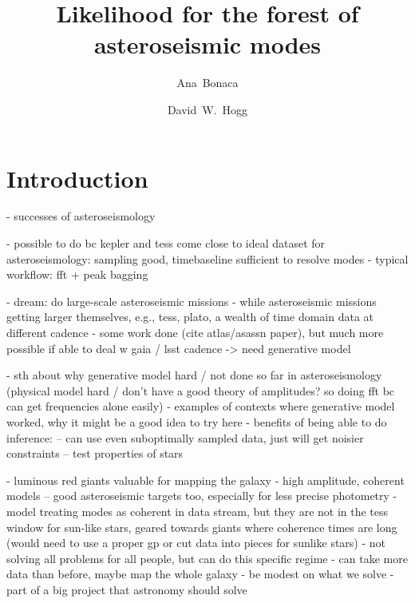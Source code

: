 \documentclass[modern]{aastex63}
\begin{document}
\sloppy\sloppypar\raggedbottom\frenchspacing %

\title{Likelihood for the forest of asteroseismic modes}


\author[0000-0002-7846-9787]{Ana~Bonaca}

\author[0000-0003-2866-9403]{David~W.~Hogg}

\begin{abstract}\noindent %
\end{abstract}

\section{Introduction}
\label{sec:intro}

- successes of asteroseismology

- possible to do bc kepler and tess come close to ideal dataset for asteroseismology: sampling good, timebaseline sufficient to resolve modes
- typical workflow: fft + peak bagging

- dream: do large-scale asteroseismic missions
- while asteroseismic missions getting larger themselves, e.g., tess, plato, a wealth of time domain data at different cadence
- some work done (cite atlas/asassn paper), but much more possible if able to deal w gaia / lsst cadence
-> need generative model

- sth about why generative model hard / not done so far in asteroseismology (physical model hard / don't have a good theory of amplitudes? so doing fft bc can get frequencies alone easily)
- examples of contexts where generative model worked, why it might be a good idea to try here
- benefits of being able to do inference:
-- can use even suboptimally sampled data, just will get noisier constraints
-- test properties of stars

- luminous red giants valuable for mapping the galaxy
- high amplitude, coherent models -- good asteroseismic targets too, especially for less precise photometry
- model treating modes as coherent in data stream, but they are not in the tess window for sun-like stars, geared towards giants where coherence times are long (would need to use a proper gp or cut data into pieces for sunlike stars)
- not solving all problems for all people, but can do this specific regime
- can take more data than before, maybe map the whole galaxy
- be modest on what we solve
- part of a big project that astronomy should solve
\end{document}
